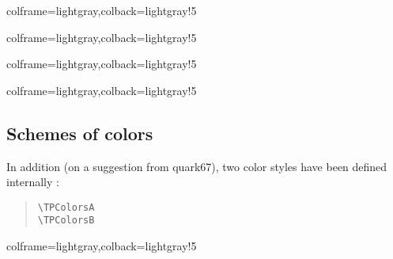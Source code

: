 \documentclass[11pt,a4paper]{ltxdoc}
\begin{document}
\begin{tcblisting}{colframe=lightgray,colback=lightgray!5}
\BoardTrivialPursuit[Rotation=35,Unit=0.5]
\BoardTrivialPursuit[Unit=0.5]
\end{tcblisting}

\begin{tcblisting}{colframe=lightgray,colback=lightgray!5}
\BoardTrivialPursuit[Unit=0.5,Icons=false]
\BoardTrivialPursuit[Unit=0.5,Colors=false]
\end{tcblisting}

\begin{tcblisting}{colframe=lightgray,colback=lightgray!5}
\BoardTrivialPursuit[Unit=0.5,Blank]
\BoardTrivialPursuit[Unit=0.5,Logo=false,Center=false,IconJoker=\faAward]
\end{tcblisting}

\begin{tcblisting}{colframe=lightgray,colback=lightgray!5}
\BoardTrivialPursuit[%
	Jokers=false,%
	ListColors={%
		blue!25,red!25,teal!25,orange!25,gray!50,violet!25},%
	ListIcons={
		\faAddressCard,\faAngleDoubleRight,\faAngry[regular],%
		\faAtom,\faBalanceScaleLeft,\faBell}
]
\end{tcblisting}

\pagebreak

\subsection{Schemes of colors}

In addition (on a suggestion from \textsf{quark67}), two color styles have been defined internally :

\begin{quote}
\begin{verbatim}
\TPColorsA
\TPColorsB
\end{verbatim}
\end{quote}

\begin{tcblisting}{colframe=lightgray,colback=lightgray!5}
\BoardTrivialPursuit[Unit=0.5,ListColors=\TPColorsA]
\BoardTrivialPursuit[Unit=0.5,ListColors=\TPColorsB]
\end{tcblisting}
\end{document}
